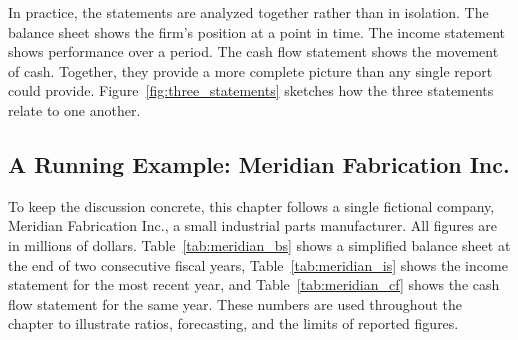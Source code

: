 \documentclass[../ai_in_finance]{subfiles}
\begin{document}
In practice, the statements are analyzed together rather than in isolation. The balance sheet shows the firm's position at a point in time. The income statement shows performance over a period. The cash flow statement shows the movement of cash. Together, they provide a more complete picture than any single report could provide. Figure~\ref{fig:three_statements} sketches how the three statements relate to one another.

\begin{figure}[htbp]
\centering
\begin{lrbox}{\bookmeasuredbox}
\end{lrbox}
\ifdim\wd\bookmeasuredbox<0.65\linewidth
\setlength{\bookcapwidth}{0.65\linewidth}
\else
\setlength{\bookcapwidth}{\wd\bookmeasuredbox}
\fi
{}
\end{figure}

\subsection{A Running Example: Meridian Fabrication Inc.}

To keep the discussion concrete, this chapter follows a single fictional company, Meridian Fabrication Inc., a small industrial parts manufacturer. All figures are in millions of dollars. Table~\ref{tab:meridian_bs} shows a simplified balance sheet at the end of two consecutive fiscal years, Table~\ref{tab:meridian_is} shows the income statement for the most recent year, and Table~\ref{tab:meridian_cf} shows the cash flow statement for the same year. These numbers are used throughout the chapter to illustrate ratios, forecasting, and the limits of reported figures.
\end{document}
